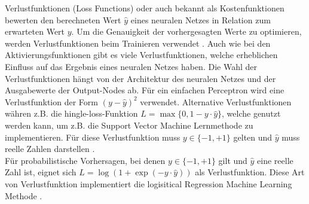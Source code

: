 Verlustfunktionen (Loss Functions) oder auch bekannt als Kostenfunktionen bewerten den berechneten Wert $\hat{y}$ eines neuralen 
Netzes in Relation zum erwarteten Wert $y$. Um die Genauigkeit der vorhergesagten Werte zu optimieren,
werden Verlustfunktionen beim Trainieren verwendet \cite{GBCL18}. Auch wie bei den Aktivierungsfunktionen gibt es
viele Verlustfunktionen, welche erheblichen Einfluss auf das Ergebnis eines neuralen Netzes haben. Die Wahl der Verlustfunktionen
hängt von der Architektur des neuralen Netzes und der Ausgabewerte der Output-Nodes ab. Für ein einfachen Perceptron wird eine 
Verlustfunktion der Form $(y - \hat{y})^2$ verwendet. 
Alternative Verlustfunktionen währen z.B. die hingle-loss-Funktion $L = \max\{0,1-y\cdot\hat{y}\}$, welche genutzt werden kann, um z.B. die 
Support Vector Machine Lernmethode zu implementieren. Für diese Verlustfunktion muss $y \in \{-1,+1\}$ gelten und $\hat{y}$ muss reelle Zahlen 
darstellen \cite{CA18}.\\
Für probabilistische Vorhersagen, bei denen $y \in \{-1,+1\}$ gilt und $\hat{y}$ eine reelle Zahl ist, eignet sich 
$L = \log(1 + \exp(-y \cdot \hat{y}))$ als Verlustfunktion. Diese Art von Verlustfunktion implementiert die logisitical Regression 
Machine Learning Methode \cite{CA18}.
